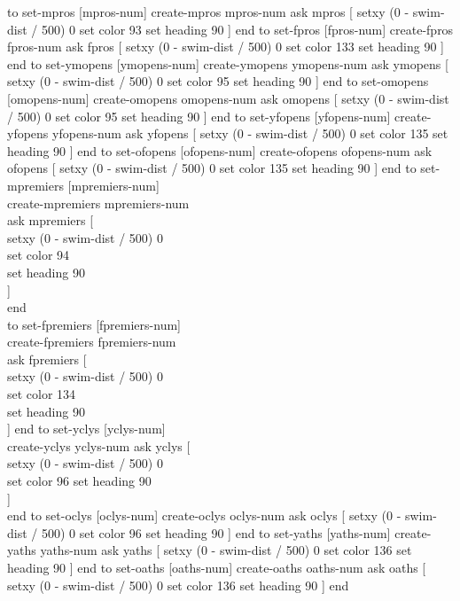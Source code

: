 \documentclass[12pt]{article}
\begin{document}
to set-mpros [mpros-num]
  create-mpros mpros-num
  ask mpros [
    setxy (0 - swim-dist / 500) 0
    set color 93
    set heading 90
    ]
end
to set-fpros [fpros-num]
  create-fpros fpros-num
  ask fpros [
    setxy (0 - swim-dist / 500) 0
    set color 133
    set heading 90
    ]
end
to set-ymopens [ymopens-num]
  create-ymopens ymopens-num
  ask ymopens [
    setxy (0 - swim-dist / 500) 0
    set color 95
    set heading 90
    ]
end
to set-omopens [omopens-num]
  create-omopens omopens-num
  ask omopens [
    setxy (0 - swim-dist / 500) 0
    set color 95
    set heading 90
    ]
end
to set-yfopens [yfopens-num]
  create-yfopens yfopens-num
  ask yfopens [
    setxy (0 - swim-dist / 500) 0
    set color 135
    set heading 90
    ]
end
to set-ofopens [ofopens-num]
  create-ofopens ofopens-num
  ask ofopens [
    setxy (0 - swim-dist / 500) 0
    set color 135
    set heading 90
    ]
end
to set-mpremiers [mpremiers-num]\\
  create-mpremiers mpremiers-num\\
  ask mpremiers [\\
    setxy (0 - swim-dist / 500) 0\\
    set color 94\\
    set heading 90\\
    ]\\
end\\
to set-fpremiers [fpremiers-num]\\
  create-fpremiers fpremiers-num\\
  ask fpremiers [\\
    setxy (0 - swim-dist / 500) 0\\
    set color 134\\
    set heading 90\\
    ]
end
to set-yclys [yclys-num]\\
  create-yclys yclys-num
  ask yclys [\\
    setxy (0 - swim-dist / 500) 0\\
    set color 96
    set heading 90\\
    ]\\
end
to set-oclys [oclys-num]
  create-oclys oclys-num
  ask oclys [
    setxy (0 - swim-dist / 500) 0
    set color 96
    set heading 90
    ]
end
to set-yaths [yaths-num]
  create-yaths yaths-num
  ask yaths [
    setxy (0 - swim-dist / 500) 0
    set color 136
    set heading 90
    ]
end
to set-oaths [oaths-num]
  create-oaths oaths-num
  ask oaths [
    setxy (0 - swim-dist / 500) 0
    set color 136
    set heading 90
    ]
end
\end{document}
